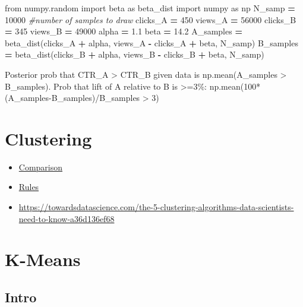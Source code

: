 \documentclass[]{book}
\newenvironment{Shaded}{\begin{snugshade}}{\end{snugshade}}
\newcommand{\DecValTok}[1]{\textcolor[rgb]{0.00,0.00,0.81}{#1}}
\newcommand{\FloatTok}[1]{\textcolor[rgb]{0.00,0.00,0.81}{#1}}
\newcommand{\ImportTok}[1]{#1}
\newcommand{\CommentTok}[1]{\textcolor[rgb]{0.56,0.35,0.01}{\textit{#1}}}
\newcommand{\OperatorTok}[1]{\textcolor[rgb]{0.81,0.36,0.00}{\textbf{#1}}}
\newcommand{\NormalTok}[1]{#1}
\theoremstyle{definition}
\theoremstyle{definition}
\theoremstyle{definition}
\theoremstyle{remark}
\begin{document}
\begin{Shaded}
\begin{Highlighting}[]
\ImportTok{from}\NormalTok{ numpy.random }\ImportTok{import}\NormalTok{ beta }\ImportTok{as}\NormalTok{ beta_dist}
\ImportTok{import}\NormalTok{ numpy }\ImportTok{as}\NormalTok{ np}
\NormalTok{N_samp }\OperatorTok{=} \DecValTok{10000} \CommentTok{#number of samples to draw}
\NormalTok{clicks_A }\OperatorTok{=} \DecValTok{450}
\NormalTok{views_A }\OperatorTok{=} \DecValTok{56000}
\NormalTok{clicks_B }\OperatorTok{=} \DecValTok{345}
\NormalTok{views_B }\OperatorTok{=} \DecValTok{49000}
\NormalTok{alpha }\OperatorTok{=} \FloatTok{1.1}
\NormalTok{beta }\OperatorTok{=} \FloatTok{14.2}
\NormalTok{A_samples }\OperatorTok{=}\NormalTok{ beta_dist(clicks_A }\OperatorTok{+}\NormalTok{ alpha, views_A }\OperatorTok{-}\NormalTok{ clicks_A }\OperatorTok{+}\NormalTok{ beta, N_samp)}
\NormalTok{B_samples }\OperatorTok{=}\NormalTok{ beta_dist(clicks_B }\OperatorTok{+}\NormalTok{ alpha, views_B }\OperatorTok{-}\NormalTok{ clicks_B }\OperatorTok{+}\NormalTok{ beta, N_samp)}
\end{Highlighting}
\end{Shaded}

Posterior prob that CTR\_A \textgreater{} CTR\_B given data is
np.mean(A\_samples \textgreater{} B\_samples). Prob that lift of A
relative to B is \textgreater{}=3\%:
np.mean(100*(A\_samples-B\_samples)/B\_samples \textgreater{} 3)

\section{Clustering}\label{clustering}

\begin{itemize}
\item
  \href{http://scikit-learn.org/stable/modules/clustering.html\#clustering}{Comparison}
\item
  \href{https://twitter.com/thomaswdinsmore/status/965223193043718145}{Rules}
\item
  \url{https://towardsdatascience.com/the-5-clustering-algorithms-data-scientists-need-to-know-a36d136ef68}
\end{itemize}

\section{K-Means}\label{k-means}

\subsection{Intro}\label{intro-3}
\end{document}
